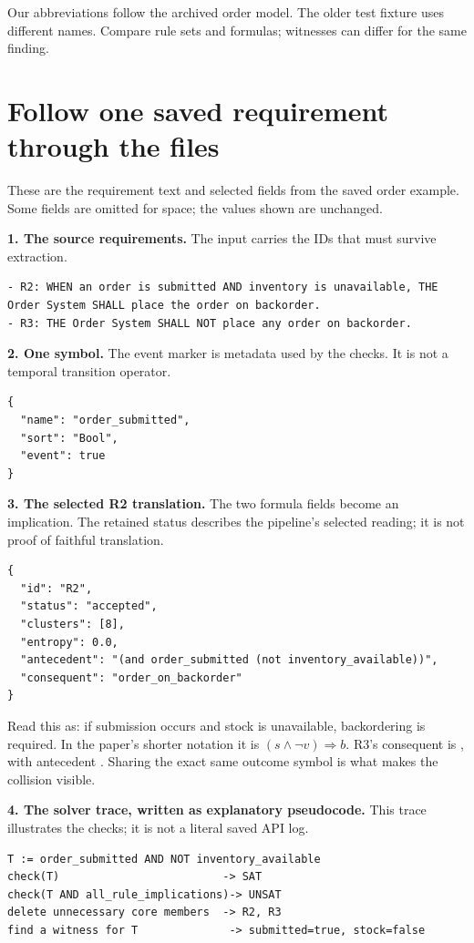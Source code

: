 Our abbreviations follow the archived order model. The older test fixture uses different names. Compare rule sets and formulas; witnesses can differ for the same finding.

\clearpage
\section{Follow one saved requirement through the files}\label{app:walkthrough}

These are the requirement text and selected fields from the saved order example. Some fields are omitted for space; the values shown are unchanged.

\textbf{1. The source requirements.} The input carries the IDs that must survive extraction.
\begin{lstlisting}
- R2: WHEN an order is submitted AND inventory is unavailable, THE Order System SHALL place the order on backorder.
- R3: THE Order System SHALL NOT place any order on backorder.
\end{lstlisting}

\textbf{2. One symbol.} The event marker is metadata used by the checks. It is not a temporal transition operator.
\begin{lstlisting}
{
  "name": "order_submitted",
  "sort": "Bool",
  "event": true
}
\end{lstlisting}

\textbf{3. The selected R2 translation.} The two formula fields become an implication. The retained status describes the pipeline's selected reading; it is not proof of faithful translation.
\begin{lstlisting}
{
  "id": "R2",
  "status": "accepted",
  "clusters": [8],
  "entropy": 0.0,
  "antecedent": "(and order_submitted (not inventory_available))",
  "consequent": "order_on_backorder"
}
\end{lstlisting}

Read this as: if submission occurs and stock is unavailable, backordering is required. In the paper's shorter notation it is $(s\land\neg v)\Rightarrow b$. R3's consequent is , with antecedent . Sharing the exact same outcome symbol is what makes the collision visible.

\clearpage
\textbf{4. The solver trace, written as explanatory pseudocode.} This trace illustrates the checks; it is not a literal saved API log.
\begin{lstlisting}
T := order_submitted AND NOT inventory_available
check(T)                         -> SAT
check(T AND all_rule_implications)-> UNSAT
delete unnecessary core members  -> R2, R3
find a witness for T              -> submitted=true, stock=false
\end{lstlisting}

